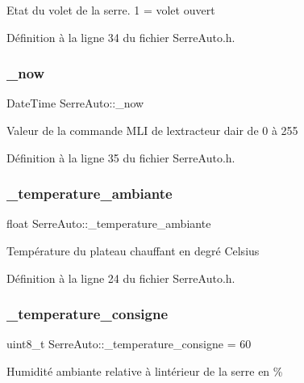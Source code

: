 Etat du volet de la serre. 1 = volet ouvert 

Définition à la ligne 34 du fichier Serre\+Auto.\+h.

\mbox{\label{class_serre_auto_a7225c4a49be74a1944d42a693efe4f0e}} 
\subsubsection{\+\_\+now}
{\footnotesize\ttfamily Date\+Time Serre\+Auto\+::\+\_\+now\hspace{0.3cm}{\ttfamily [private]}}

Valeur de la commande M\+LI de l\textquotesingle{}extracteur d\textquotesingle{}air de 0 à 255 

Définition à la ligne 35 du fichier Serre\+Auto.\+h.

\mbox{\label{class_serre_auto_a338d293039946c7744447d8a4194a860}} 
\subsubsection{\+\_\+temperature\+\_\+ambiante}
{\footnotesize\ttfamily float Serre\+Auto\+::\+\_\+temperature\+\_\+ambiante\hspace{0.3cm}{\ttfamily [private]}}

Température du plateau chauffant en degré Celsius 

Définition à la ligne 24 du fichier Serre\+Auto.\+h.

\mbox{\label{class_serre_auto_a02038ab4fae49a1f2b6c09c545e83328}} 
\subsubsection{\+\_\+temperature\+\_\+consigne}
{\footnotesize\ttfamily uint8\+\_\+t Serre\+Auto\+::\+\_\+temperature\+\_\+consigne = 60\hspace{0.3cm}{\ttfamily [private]}}

Humidité ambiante relative à l\textquotesingle{}intérieur de la serre en \% 

